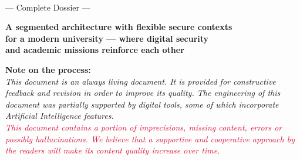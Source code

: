 \documentclass[11pt,a4paper,twoside]{book}
\begin{document}
\hypersetup{pageanchor=false}
\begin{titlepage}
\centering
\vspace*{0.5cm}

{\suittitlelogo}

\vspace{0.8cm}

{\Huge\bfseries \suitpolicytitlemain\\[0.35cm]
\suitpolicytitlerest}

\vspace{0.6cm}

{\LARGE\itshape \suitpolicysubtitle}

\vspace{0.8cm}

\suiteditionline

\vspace{0.8cm}

{\large --- Complete Dossier ---}

\vspace{0.5cm}

\suitmetablock

\vspace{0.5cm}

\begin{tcolorbox}[
    colback=NavyBlue!8!white,
    colframe=NavyBlue!85!black,
    boxrule=1.2pt,
    arc=3pt,
    left=12pt, right=12pt, top=8pt, bottom=8pt,
    width=0.88\textwidth,
    halign=center
]
{\large\bfseries A segmented architecture with flexible secure contexts\\[4pt]
for a modern university --- where digital security\\[4pt]
and academic missions reinforce each other}
\end{tcolorbox}

\vspace{0.3cm}
{\small\noindent \textbf{Note on the process:}\\
\textit{This document is an always living document.
It is provided for constructive feedback and revision in order to improve its quality.
The engineering of this document was partially supported by digital tools, some of which incorporate Artificial Intelligence features.}\\[3pt]
\textcolor{Crimson}{\textit{This document contains a portion of imprecisions, missing content, errors or possibly hallucinations. We believe that a supportive and cooperative approach by the readers will make its content quality increase over time.}}}\par


\end{titlepage}
\end{document}
